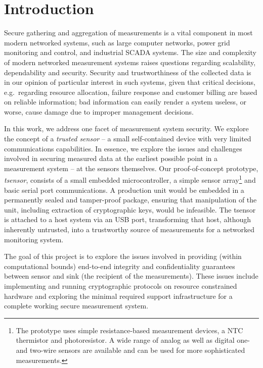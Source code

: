 
\chapter{Introduction}
\label{sec:intro}

Secure gathering and aggregation of measurements is a vital component in most modern networked systems, such as large computer networks, power grid monitoring and control, and industrial SCADA systems. The size and complexity of modern networked measurement systems raises questions regarding scalability, dependability and security. Security and trustworthiness of the collected data is in our opinion of particular interest in such systems, given that critical decisions, e.g.\ regarding resource allocation, failure response and customer billing are based on reliable information; bad information can easily render a system useless, or worse, cause damage due to improper management decisions.

In this work, we address one facet of measurement system security. We explore the concept of a \textit{trusted sensor} -- a small self-contained device with very limited communications capabilities. In essence, we explore the issues and challenges involved in securing measured data at the earliest possible point in a measurement system -- at the sensors themselves.
%
Our proof-of-concept prototype, \textit{tsensor}, consists of a small embedded microcontroller, a simple sensor array\footnote{The prototype uses simple resistance-based measurement devices, a NTC thermistor and photoresistor. A wide range of analog as well as digital one- and two-wire sensors are available and can be used for more sophisticated measurements.} and basic serial port communications. A production unit would be embedded in a permanently sealed and tamper-proof package, ensuring that manipulation of the unit, including extraction of cryptographic keys, would be infeasible. 
The tsensor is attached to a host system via an USB port, transforming that host, although inherently untrusted, into a trustworthy source of measurements for a networked monitoring system.

The goal of this project is to explore the issues involved in providing (within computational bounds) end-to-end integrity and confidentiality guarantees between sensor and sink (the recipient of the measurements). These issues include implementing and running cryptographic protocols on resource constrained hardware and exploring the minimal required support infrastructure for a complete working secure measurement system.

